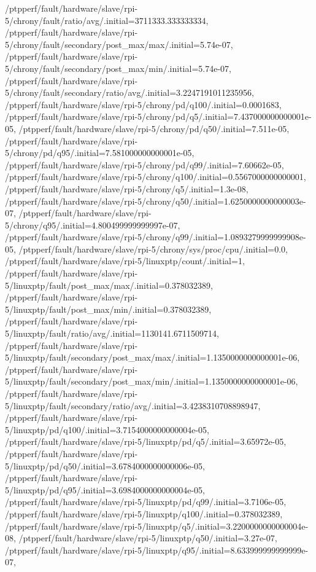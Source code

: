 {    /ptpperf/fault/hardware/slave/rpi-5/chrony/fault/ratio/avg/.initial=3711333.333333334,
    /ptpperf/fault/hardware/slave/rpi-5/chrony/fault/secondary/post_max/max/.initial=5.74e-07,
    /ptpperf/fault/hardware/slave/rpi-5/chrony/fault/secondary/post_max/min/.initial=5.74e-07,
    /ptpperf/fault/hardware/slave/rpi-5/chrony/fault/secondary/ratio/avg/.initial=3.2247191011235956,
    /ptpperf/fault/hardware/slave/rpi-5/chrony/pd/q100/.initial=0.0001683,
    /ptpperf/fault/hardware/slave/rpi-5/chrony/pd/q5/.initial=7.437000000000001e-05,
    /ptpperf/fault/hardware/slave/rpi-5/chrony/pd/q50/.initial=7.511e-05,
    /ptpperf/fault/hardware/slave/rpi-5/chrony/pd/q95/.initial=7.581000000000001e-05,
    /ptpperf/fault/hardware/slave/rpi-5/chrony/pd/q99/.initial=7.60662e-05,
    /ptpperf/fault/hardware/slave/rpi-5/chrony/q100/.initial=0.5567000000000001,
    /ptpperf/fault/hardware/slave/rpi-5/chrony/q5/.initial=1.3e-08,
    /ptpperf/fault/hardware/slave/rpi-5/chrony/q50/.initial=1.6250000000000003e-07,
    /ptpperf/fault/hardware/slave/rpi-5/chrony/q95/.initial=4.800499999999997e-07,
    /ptpperf/fault/hardware/slave/rpi-5/chrony/q99/.initial=1.0893279999999908e-05,
    /ptpperf/fault/hardware/slave/rpi-5/chrony/sys/proc/cpu/.initial=0.0,
    /ptpperf/fault/hardware/slave/rpi-5/linuxptp/count/.initial=1,
    /ptpperf/fault/hardware/slave/rpi-5/linuxptp/fault/post_max/max/.initial=0.378032389,
    /ptpperf/fault/hardware/slave/rpi-5/linuxptp/fault/post_max/min/.initial=0.378032389,
    /ptpperf/fault/hardware/slave/rpi-5/linuxptp/fault/ratio/avg/.initial=1130141.6711509714,
    /ptpperf/fault/hardware/slave/rpi-5/linuxptp/fault/secondary/post_max/max/.initial=1.1350000000000001e-06,
    /ptpperf/fault/hardware/slave/rpi-5/linuxptp/fault/secondary/post_max/min/.initial=1.1350000000000001e-06,
    /ptpperf/fault/hardware/slave/rpi-5/linuxptp/fault/secondary/ratio/avg/.initial=3.4238310708898947,
    /ptpperf/fault/hardware/slave/rpi-5/linuxptp/pd/q100/.initial=3.7154000000000004e-05,
    /ptpperf/fault/hardware/slave/rpi-5/linuxptp/pd/q5/.initial=3.65972e-05,
    /ptpperf/fault/hardware/slave/rpi-5/linuxptp/pd/q50/.initial=3.6784000000000006e-05,
    /ptpperf/fault/hardware/slave/rpi-5/linuxptp/pd/q95/.initial=3.6984000000000004e-05,
    /ptpperf/fault/hardware/slave/rpi-5/linuxptp/pd/q99/.initial=3.7106e-05,
    /ptpperf/fault/hardware/slave/rpi-5/linuxptp/q100/.initial=0.378032389,
    /ptpperf/fault/hardware/slave/rpi-5/linuxptp/q5/.initial=3.2200000000000004e-08,
    /ptpperf/fault/hardware/slave/rpi-5/linuxptp/q50/.initial=3.27e-07,
    /ptpperf/fault/hardware/slave/rpi-5/linuxptp/q95/.initial=8.633999999999999e-07,
}
